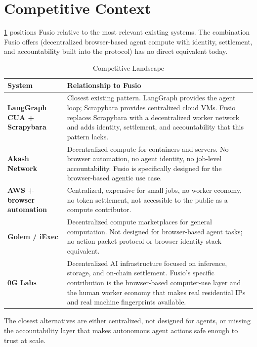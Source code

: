 \documentclass[10pt,twocolumn]{article}
\begin{document}
\section{Competitive Context}
\label{sec:competitive}

\cref{tab:competitive} positions Fusio relative to the most relevant existing systems. The combination Fusio offers (decentralized browser-based agent compute with identity, settlement, and accountability built into the protocol) has no direct equivalent today.

\begin{table}[H]
\centering
\caption{Competitive Landscape}
\label{tab:competitive}
\renewcommand{\arraystretch}{1.4}
\begin{tabularx}{\columnwidth}{>{\bfseries\small}p{1.7cm} X}
\toprule
System & Relationship to Fusio \\
\midrule
LangGraph CUA + Scrapybara &
  Closest existing pattern. LangGraph provides the agent loop; Scrapybara provides centralized cloud VMs. Fusio replaces Scrapybara with a decentralized worker network and adds identity, settlement, and accountability that this pattern lacks. \\[3pt]
Akash Network &
  Decentralized compute for containers and servers. No browser automation, no agent identity, no job-level accountability. Fusio is specifically designed for the browser-based agentic use case. \\[3pt]
AWS + browser automation &
  Centralized, expensive for small jobs, no worker economy, no token settlement, not accessible to the public as a compute contributor. \\[3pt]
Golem / iExec &
  Decentralized compute marketplaces for general computation. Not designed for browser-based agent tasks; no action packet protocol or browser identity stack equivalent. \\[3pt]
0G Labs &
  Decentralized AI infrastructure focused on inference, storage, and on-chain settlement. Fusio's specific contribution is the browser-based computer-use layer and the human worker economy that makes real residential IPs and real machine fingerprints available. \\
\bottomrule
\end{tabularx}
\end{table}

The closest alternatives are either centralized, not designed for agents, or missing the accountability layer that makes autonomous agent actions safe enough to trust at scale.
\end{document}
